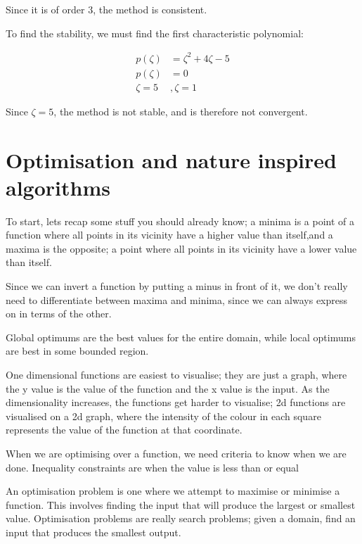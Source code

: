 \begin{description}
Since it is of order $3$, the method is consistent.

To find the stability, we must find the first characteristic
polynomial:

\[
\begin{split}
  p(\zeta) &= \zeta^2 + 4\zeta - 5\\
  p(\zeta) &= 0\\
  \zeta = 5&, \zeta = 1
\end{split}
\]

Since $\zeta = 5$, the method is not stable, and is therefore not
convergent.

\end{description}


\section{Optimisation and nature inspired algorithms}

To start, lets recap some stuff you should already know; a minima is a
point of a function where all points in its vicinity have a higher
value than itself,and a maxima is the opposite; a point where all
points in its vicinity have a lower value than itself.

Since we can invert a function by putting a minus in front of it, we don't
really need to differentiate between maxima and minima, since we can always
express on in terms of the other.

Global optimums are the best values for the entire domain, while local optimums
are best in some bounded region.

One dimensional functions are easiest to visualise; they are just a graph, where
the y value is the value of the function and the x value is the input. As the
dimensionality increases, the functions get harder to visualise; 2d functions
are visualised on a 2d graph, where the intensity of the colour in each square
represents the value of the function at that coordinate. 

When we are optimising over a function, we need criteria to know when
we are done. Inequality constraints are when the value is less than or equal

An optimisation problem is one where we attempt to maximise or minimise a
function. This involves finding the input that will produce the largest or
smallest value. Optimisation problems are really search problems; given a
domain, find an input that produces the smallest output.

